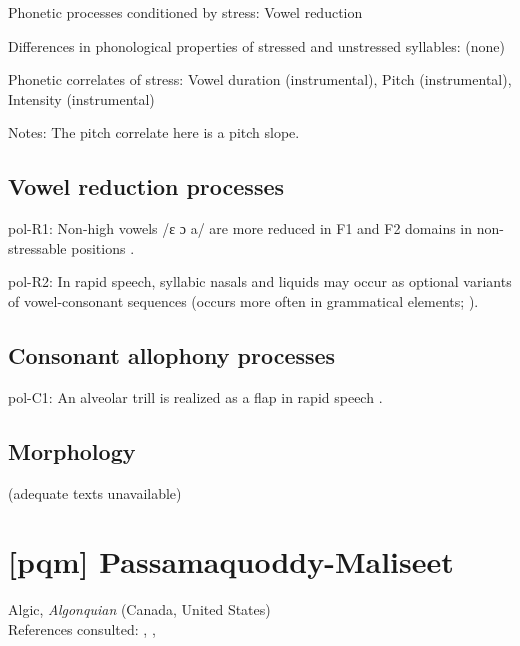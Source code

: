 {\begin{appendixdesc}
\item[Phonetic processes conditioned by stress:] Vowel reduction

\item[Differences in phonological properties of stressed and unstressed syllables:] (none)

\item[Phonetic correlates of stress:] Vowel duration (instrumental), Pitch (instrumental), Intensity (instrumental)

\item[Notes:] The pitch correlate here is a pitch slope.
\end{appendixdesc}
\subsection*{Vowel reduction processes}
\begin{appendixdesc}

\item[pol-R1:] Non-high vowels /ɛ ɔ a/ are more reduced in F1 and F2 domains in non-stressable positions \citep[378--379]{Nowak2006}.

\item[pol-R2:] In rapid speech, syllabic nasals and liquids may occur as optional variants of vowel-consonant sequences (occurs more often in grammatical elements; \citealt{Rubach1974}).
\end{appendixdesc}
\subsection*{Consonant allophony processes}
\begin{appendixdesc}

\item[pol-C1:] An alveolar trill is realized as a flap in rapid speech \citep[132]{Rocławski1976}.
\end{appendixdesc}
\subsection*{Morphology}

(adequate texts unavailable)

\section*{[pqm] Passamaquoddy-Maliseet}  %
Algic, \textit{Algonquian} (Canada, United States)\medskip\\
References consulted: \citet{Leavitt1996}, \citet{LeSourd1993}, \citet{Sherwood1986}

}
